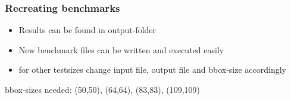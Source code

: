 \begin{frame}
	\frametitle{Recreating benchmarks}
	\vspace{2.5cm}
	\large
	\begin{itemize}
	\item Results can be found in output-folder
	\item New benchmark files can be written and executed easily
	\item for other testsizes change input file, output file and bbox-size accordingly
	\end{itemize}

	bbox-sizes needed: (50,50), (64,64), (83,83), (109,109)
	
\end{frame}





